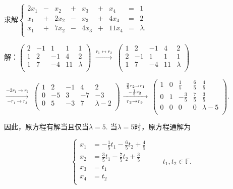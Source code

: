 \begin{frame}
\setlength{\arraycolsep}{2pt}
\begin{example}
求解$\left\{\begin{array}{rrrrrrrrr}
2x_1 & - &  x_2 & + &  x_3 & + &  x_4 & = & 1 \\
x_1 & + & 2x_2 & - &  x_3 & + & 4x_4 & = & 2 \\
x_1 & + & 7x_2 & - & 4x_3 & + & 11x_4 & = & \lambda. \\
\end{array}\right.$
\end{example}
\pp
\bigskip

解：$\left(\begin{array}{rrrrr}2&-1&1&1&1\\1&2&-1&4&2\\1&7&-4&11&\lambda\\\end{array}\right)$	 \pp
$\xrightarrow{r_1\leftrightarrow r_2}$
$\left(\begin{array}{rrrrr}1&2&-1&4&2\\2&-1&1&1&1\\1&7&-4&11&\lambda\\\end{array}\right)$	 \pp
\bigskip

$\xrightarrow[-r_1\rightarrow r_3]{-2r_1\rightarrow r_2}$
$\left(\begin{array}{rrrrr}1&2&-1&4&2\\0&-5&3&-7&-3\\0&5&-3&7&\lambda-2\\\end{array}\right)$	 \pp
$\xrightarrow[r_2\rightarrow r_3]{\frac25r_2\rightarrow r_1\atop -\frac15r_2}$
$\left(\begin{array}{rrrrr}1&0&\frac15&\frac65&\frac45\\0&1&-\frac35&\frac75&\frac35\\0&0&0&0&\lambda-5\\\end{array}\right)$. \pp
\bigskip

因此，原方程有解当且仅当$\lambda=5$. \pp  当$\lambda=5$时，原方程通解为

\bigskip

\[\left\{\begin{array}{rl}
x_1 & = -\frac15t_1 -\frac65t_2 + \frac45\\
x_2 & = \frac35t_1 -\frac75t_2 + \frac35\\
x_3 & = t_1\\
x_4 & = t_2\\
\end{array}\right. \qquad t_1,t_2\in \mathbb F.\]
\end{frame}


